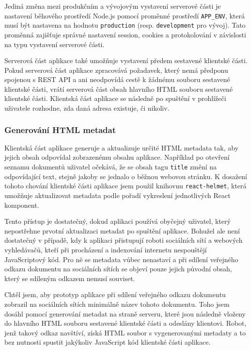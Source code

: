 Jediná změna mezi produkčním a vývojovým vystavení serverové části je nastavení běhového prostředí Node.js pomocí proměnné prostředí \texttt{APP\_ENV}, která musí být nastavena na hodnotu \texttt{production} (resp. \texttt{development} pro vývoj).
Tato proměnná zajišťuje správné nastavení session, cookies a protokolování v závislosti na typu vystavení serverové části.

Serverová část aplikace také umožňuje vystavení předem sestavené klientské části.
Pokud serverová část aplikace zpracovává požadavek, který nemá předponu spojenou s \gls{REST} \gls{API} a ani neodpovídá cestě k žádnému souboru sestavené klientské části, vrátí serverová část obsah hlavního \gls{HTML} souboru sestavené klientské části.
Klientská část aplikace se následně po spuštění v prohlížeči uživatele rozhodne, zda daná adresa existuje, či nikoliv.

\subsubsection{Generování HTML metadat}

Klientská část aplikace generuje a aktualizuje určité \gls{HTML} metadata tak, aby jejich obsah odpovídal zobrazenému obsahu aplikace.
Například po otevření seznamu dokumentů uživatel očekává, že se obsah tagu \texttt{title} změní na odpovídající text, stejně jakoby se jednalo o běžnou webovou stránku.
K dosažení tohoto chování klientské části aplikace jsem použil knihovnu \texttt{react-helmet}, která umožňuje aktualizovat metadata podle pořadí vykreslení jednotlivých React komponent.

Tento přístup je dostatečný, dokud aplikaci používá obyčejný uživatel, který nepostřehne prvotní aktualizaci metadat po spuštění aplikace.
Bohužel ale není dostatečný v případě, kdy k aplikaci přistupují roboti sociálních sítí a webových vyhledávačů, kteří při procházení a indexování internetu nespouštějí JavaScriptový kód.
Pro ně se metadata vůbec nenastaví a při sdílení veřejného odkazu dokumentu na sociálních sítích se objeví pouze jejich původní obsah, který se sdíleným odkazem nemusí souviset.

Chtěl jsem, aby prototyp aplikace při sdílení veřejného odkazu dokumentu zobrazil na sociálních sítích minimálně název tohoto dokumentu.
Toho jsem dosáhl pomocí generování metadat na straně serveru, které jsou následně vloženy do hlavního \gls{HTML} souboru sestavené klientské části a odeslány klientovi.
Robot, jenž takový odkaz navštíví, získá \gls{HTML} soubor s vygenerovanými metadaty a to bez nutnosti spustit jakýkoliv JavaScript kód klientské části aplikace.

